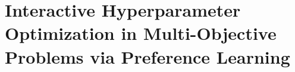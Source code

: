 
\chapter{Interactive Hyperparameter Optimization in Multi-Objective Problems via Preference Learning}
\label{human-centric-chap:moo}